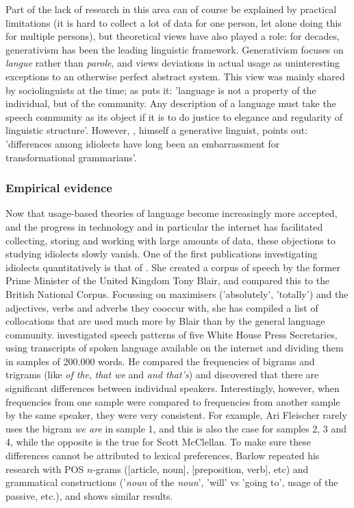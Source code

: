 \documentclass[12pt]{article}
\begin{document}
Part of the lack of research in this area can of course be explained by practical limitations (it is hard to collect a lot of data for one person, let alone doing this for multiple persons), but theoretical views have also played a role: for decades, generativism has been the leading linguistic framework. Generativism focuses on \emph{langue} rather than \emph{parole}, and views deviations in actual usage as uninteresting exceptions to an otherwise perfect abstract system. This view was mainly shared by sociolinguists at the time; as  puts it: 'language is not a property of the individual, but of the community. Any description of a language must take the speech community as its object if it is to do justice to elegance and regularity of linguistic structure'. However, , himself a generative linguist, points out: 'differences among idiolects have long been an embarrassment for transformational grammarians'.

\subsubsection{Empirical evidence}
Now that usage-based theories of language become increasingly more accepted, and the progress in technology and in particular the internet has facilitated collecting, storing and working with large amounts of data, these objections to studying idiolects slowly vanish. One of the first publications investigating idiolects quantitatively is that of . She created a corpus of speech by the former Prime Minister of the United Kingdom Tony Blair, and compared this to the British National Corpus. Focussing on maximisers ('absolutely', 'totally') and the adjectives, verbs and adverbs they cooccur with, she has compiled a list of collocations that are used much more by Blair than by the general language community.  investigated speech patterns of five White House Press Secretaries, using transcripts of spoken language available on the internet and dividing them in samples of 200.000 words. He compared the frequencies of bigrams and trigrams (like \emph{of the}, \emph{that we} and \emph{and that's}) and discovered that there are significant differences between individual speakers. Interestingly, however, when frequencies from one sample were compared to frequencies from another sample by the same speaker, they were very consistent. For example, Ari Fleischer rarely uses the bigram \emph{we are} in sample 1, and this is also the case for samples 2, 3 and 4, while the opposite is the true for Scott McClellan. To make sure these differences cannot be attributed to lexical preferences, Barlow repeated his research with POS $n$-grams ([article, noun], [preposition, verb], etc) and grammatical constructions ('\emph{noun} of the \emph{noun}',  'will' vs 'going to', usage of the passive, etc.), and shows similar results.
\end{document}
